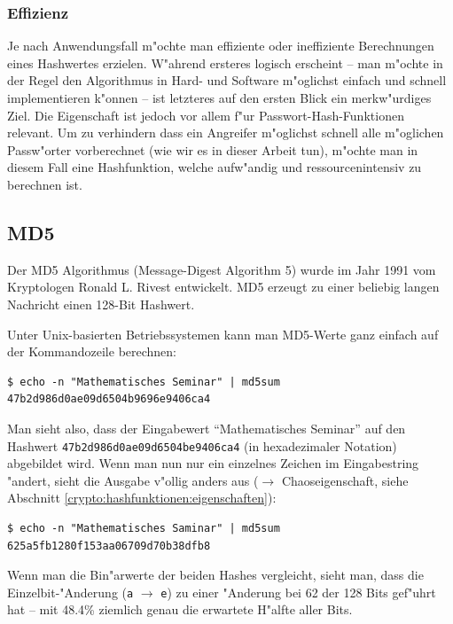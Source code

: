 \begin{refsection}
\subsubsection{Effizienz}

Je nach Anwendungsfall m"ochte man effiziente oder ineffiziente Berechnungen
eines Hashwertes erzielen. W"ahrend ersteres logisch erscheint -- man m"ochte in
der Regel den Algorithmus in Hard- und Software m"oglichst einfach und schnell
implementieren k"onnen -- ist letzteres auf den ersten Blick ein merkw"urdiges
Ziel. Die Eigenschaft ist jedoch vor allem f"ur Passwort-Hash-Funktionen
relevant. Um zu verhindern dass ein Angreifer m"oglichst schnell alle m"oglichen
Passw"orter vorberechnet (wie wir es in dieser Arbeit tun), m"ochte man in
diesem Fall eine Hashfunktion, welche aufw"andig und ressourcenintensiv zu
berechnen ist.

\subsection{MD5}

Der MD5 Algorithmus (Message-Digest Algorithm 5) wurde im Jahr 1991 vom
Kryptologen Ronald L. Rivest entwickelt. MD5 erzeugt zu einer beliebig langen
Nachricht einen 128-Bit Hashwert.

Unter Unix-basierten Betriebssystemen kann man MD5-Werte ganz einfach auf der
Kommandozeile berechnen:

\begin{verbatim}
$ echo -n "Mathematisches Seminar" | md5sum 
47b2d986d0ae09d6504b9696e9406ca4
\end{verbatim}

Man sieht also, dass der Eingabewert ``Mathematisches Seminar'' auf den Hashwert
\texttt{47b2\-d986\-d0ae\-09d6\-504b\-e940\-6ca4} (in hexadezimaler
Notation) abgebildet wird. Wenn man nun nur ein einzelnes Zeichen im
Eingabestring "andert, sieht die Ausgabe v"ollig anders aus ($\rightarrow$
Chaoseigenschaft, siehe Abschnitt \ref{crypto:hashfunktionen:eigenschaften}):

\begin{verbatim}
$ echo -n "Mathematisches Saminar" | md5sum 
625a5fb1280f153aa06709d70b38dfb8
\end{verbatim}

Wenn man die Bin"arwerte der beiden Hashes vergleicht, sieht man, dass die
Einzelbit-"Anderung (\texttt{a} $\rightarrow$ \texttt{e}) zu einer "Anderung bei
62 der 128 Bits gef"uhrt hat -- mit 48.4\% ziemlich genau die erwartete H"alfte
aller Bits.


\end{refsection}
